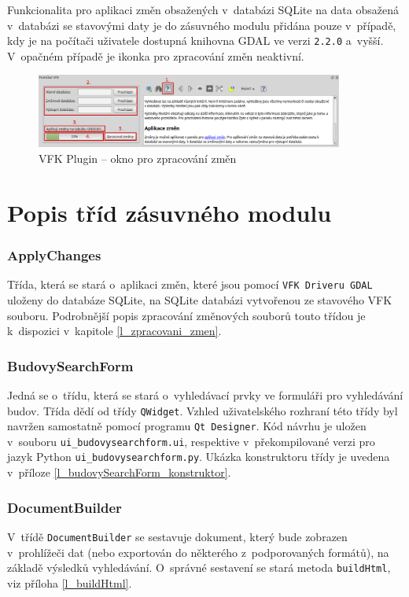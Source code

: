 \documentclass[a4paper,12pt,oneside]{book}
\begin{document}
Funkcionalita pro aplikaci změn obsažených v~databázi SQLite na data
obsažená v~databázi se stavovými daty je do zásuvného modulu přidána
pouze v~případě, kdy je na počítači uživatele dostupná knihovna GDAL
ve verzi \texttt{2.2.0} a~vyšší. V~opačném případě je ikonka pro
zpracování změn neaktivní.

\begin{figure}[htb]
\centering
\includegraphics[width=0.9\textwidth]{images/vfkPlugin-zmeny.png}
\caption[VFK Plugin -- okno pro zpracování změn]{VFK Plugin -- okno pro zpracování změn}
\label{l_plugin_zmeny}
\end{figure}


\clearpage
\section{Popis tříd zásuvného modulu}

\subsubsection{ApplyChanges}
Třída, která se stará o~aplikaci změn, které jsou pomocí \texttt{VFK
  Driveru GDAL} uloženy do databáze SQLite, na SQLite databázi
vytvořenou ze stavového VFK souboru. Podrobnější popis zpracování
změnových souborů touto třídou je k~dispozici v~kapitole
\ref{l_zpracovani_zmen}.

\subsubsection{BudovySearchForm}
Jedná se o~třídu, která se stará o~vyhledávací prvky ve formuláři pro
vyhledávání budov. Třída dědí od třídy \texttt{QWidget}. Vzhled
uživatelského rozhraní této třídy byl navržen samostatně pomocí
programu \texttt{Qt Designer}. Kód návrhu je uložen v~souboru
\texttt{ui\_budovysearchform.ui}, respektive v~překompilované verzi
pro jazyk Python \texttt{ui\_budovysearchform.py}. Ukázka konstruktoru
třídy je uvedena v~příloze \ref{l_budovySearchForm_konstruktor}.

\subsubsection{DocumentBuilder}
V~třídě \texttt{DocumentBuilder} se sestavuje dokument, který bude
zobrazen v~prohlížeči dat (nebo exportován do některého
z~podporovaných formátů), na základě výsledků vyhledávání. O~správné
sestavení se stará metoda \texttt{buildHtml}, viz příloha
\ref{l_buildHtml}.
\end{document}
